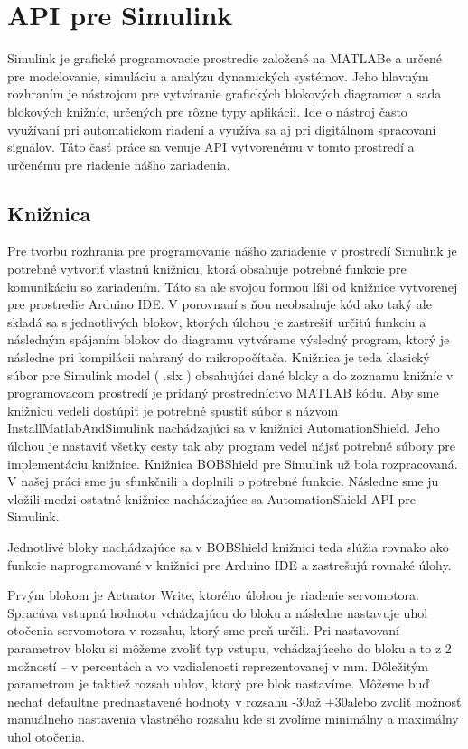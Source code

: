 \section{API pre Simulink}
\label{kap:3.2}

Simulink je grafické programovacie prostredie založené na MATLABe a určené pre modelovanie, simuláciu a analýzu dynamických systémov.  Jeho hlavným rozhraním je nástrojom pre vytváranie grafických blokových diagramov a sada blokových knižníc, určených pre rôzne typy aplikácií. Ide o nástroj často využívaní pri automatickom riadení a využíva sa aj pri digitálnom spracovaní signálov. Táto časť práce sa venuje API vytvorenému v tomto prostredí a určenému pre riadenie nášho zariadenia. 

\subsection{Knižnica}
\label{kap:3.2.1}
Pre tvorbu rozhrania pre programovanie nášho zariadenie v prostredí Simulink je potrebné vytvoriť vlastnú knižnicu, ktorá obsahuje potrebné funkcie pre komunikáciu so zariadením.  Táto sa ale svojou formou líši od knižnice vytvorenej pre prostredie Arduino IDE. V porovnaní s ňou neobsahuje kód ako taký ale skladá sa s jednotlivých blokov, ktorých úlohou je zastrešiť určitú funkciu a následným spájaním blokov do diagramu vytvárame výsledný program, ktorý je následne pri kompilácii nahraný do mikropočítača. Knižnica je teda klasický súbor pre Simulink model ( .slx ) obsahujúci dané bloky a do zoznamu knižníc v programovacom prostredí je pridaný prostredníctvo MATLAB kódu. Aby sme knižnicu vedeli dostúpiť je potrebné spustiť súbor s názvom InstallMatlabAndSimulink nachádzajúci sa v knižnici AutomationShield. Jeho úlohou je nastaviť všetky cesty tak aby program vedel nájsť potrebné súbory pre implementáciu knižnice. Knižnica BOBShield pre Simulink už bola rozpracovaná. V našej práci sme ju sfunkčnili a doplnili o potrebné funkcie. Následne sme ju vložili medzi ostatné knižnice nachádzajúce sa AutomationShield API pre Simulink.


Jednotlivé bloky nachádzajúce sa v BOBShield knižnici teda slúžia rovnako ako funkcie naprogramované v knižnici pre Arduino IDE a zastrešujú rovnaké úlohy.

Prvým blokom je Actuator Write, ktorého úlohou je riadenie servomotora. Spracúva vstupnú hodnotu vchádzajúcu do bloku a následne nastavuje uhol otočenia servomotora v rozsahu, ktorý sme preň určili. Pri nastavovaní parametrov bloku si môžeme zvoliť typ vstupu, vchádzajúceho do bloku a to z 2 možností – v percentách a vo vzdialenosti reprezentovanej v mm.  Dôležitým parametrom je taktiež rozsah uhlov, ktorý pre blok nastavíme. Môžeme buď nechať defaultne prednastavené hodnoty v rozsahu -30\degree až +30\degree alebo zvoliť možnosť manuálneho nastavenia vlastného rozsahu kde si zvolíme minimálny a maximálny uhol otočenia.

